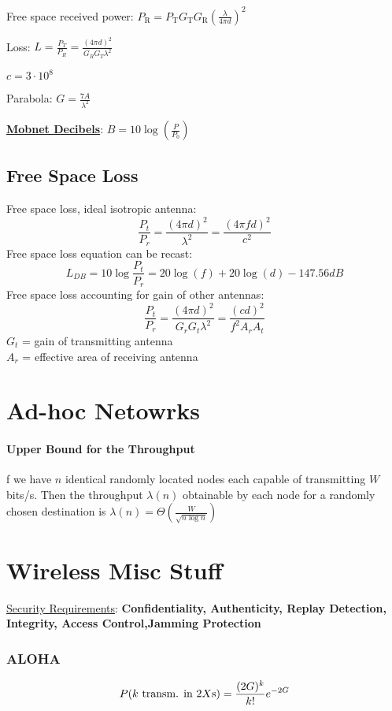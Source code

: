 \documentclass[10pt, a4paper,twocolumn]{scrartcl}
\begin{document}
Free space received power: $P_\textrm{R} =  P_\textrm{T}G_\textrm{T}G_\textrm{R}(\frac{\lambda}{4\pi d})^2$

Loss: $L = \frac{P_T}{P_R} = \frac{(4\pi d)^2}{G_RG_T\lambda^2} $

$ c = 3 \cdot 10^8 $

Parabola: $G = \frac{7A}{\lambda^2}$

\underline{\textbf{Mobnet Decibels}}:
$B = 10\log(\frac{P}{P_0})$
\subsection{Free Space Loss}
Free space loss, ideal isotropic antenna:
$$ \frac{P_t}{P_r} = \frac{(4\pi d)^2}{\lambda^2} = \frac{(4\pi fd)^2}{c^2} $$
Free space loss equation can be recast:
$$L_{DB} = 10\log \frac{P_t}{P_r} = 20 \log(f) +20\log(d) - 147.56 dB$$
Free space loss accounting for gain of other antennas: 
$$\frac{P_t}{P_r} = \frac{(4\pi d)^2}{G_rG_t\lambda^2} = \frac{(cd)^2}{f^2A_rA_t}$$
$G_t$ = gain of transmitting antenna\\
$A_r$ = effective area of receiving antenna

\section{Ad-hoc Netowrks} %
\paragraph{Upper Bound for the Throughput} 
f we have $n$ identical randomly located nodes each capable of transmitting $W$ bits/s. 
Then the throughput $\lambda(n)$ obtainable by each node for a randomly chosen destination is $\lambda(n) = \Theta\left(\frac W{\sqrt{n\log n}}\right)$


\section{Wireless Misc Stuff}
\underline{Security Requirements}:
\textbf{Confidentiality, Authenticity, Replay Detection, Integrity, Access Control,Jamming Protection}


\subsubsection{ALOHA}
\begin{equation*}
P(k \text{ transm. in } 2X\text s) = \frac{(2G)^k}{k!} e^{-2G}
\end{equation*}
\end{document}
